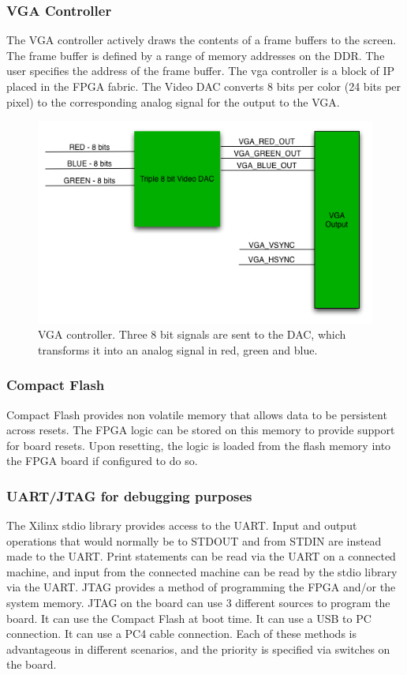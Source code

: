 \documentclass[11pt,letter,oneside]{report}
\begin{document}
     	\subsubsection{VGA Controller}
		The VGA controller actively draws the contents of a frame buffers to the screen. The frame buffer is defined by a range of memory addresses on the DDR. The user specifies the address of the frame buffer. The vga controller is a block of IP placed in the FPGA fabric. The Video DAC converts 8 bits per color (24 bits per pixel) to the corresponding analog signal for the output to the VGA.

		\begin{figure}[ht]
		\centering
		\includegraphics[scale=.8]{VGA.jpg}
		\caption{VGA controller. Three 8 bit signals are sent to the DAC, which transforms it into an analog signal in red, green and blue.}
		\label{fig:vga}
		\end{figure}
	\subsubsection{Compact Flash}
		Compact Flash provides non volatile memory that allows data to be persistent across resets. The FPGA logic can be stored on this memory to provide support for board resets. Upon resetting, the logic is loaded from the flash memory into the FPGA board if configured to do so.
	\subsubsection{UART/JTAG for debugging purposes}
	\label{sec:jtag}
		The Xilinx stdio library provides access to the UART.  Input and output operations that would normally be to STDOUT and from STDIN are instead made to the UART.  Print statements can be read via the UART on a connected machine,  and input from the connected machine can be read by the stdio library via the UART.  JTAG provides a method of programming the FPGA and/or the system memory.  JTAG on the board can use 3 different sources to program the board.  It can use the Compact Flash at boot time.  It can use a USB to PC connection.  It can use a PC4 cable connection.  Each of these methods is advantageous in different scenarios, and the priority is specified via switches on the board.
\end{document}

